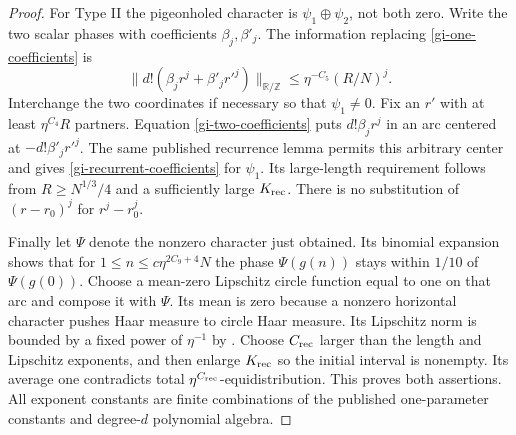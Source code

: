 \documentclass[11pt]{article}
\theoremstyle{definition}
\theoremstyle{remark}
\begin{document}
\begin{proof}
For Type II the pigeonholed character is $\psi_1\oplus\psi_2$, not both
zero.  Write the two scalar phases with coefficients $\beta_j,\beta'_j$.
The information replacing \eqref{gi-one-coefficients} is
\begin{equation}\label{gi-two-coefficients}
 \|d!(\beta_jr^j+\beta'_jr'^j)\|_{\mathbb R/\mathbb Z}
                        \leq\eta^{-C_5}(R/N)^j.
\end{equation}
Interchange the two coordinates if necessary so that $\psi_1\ne0$.
Fix an $r'$ with at least $\eta^{C_4}R$ partners.  Equation
\eqref{gi-two-coefficients} puts $d!\beta_jr^j$ in an arc centered at
$-d!\beta'_jr'^j$.  The same published recurrence lemma permits this
arbitrary center and gives \eqref{gi-recurrent-coefficients} for
$\psi_1$.  Its large-length requirement follows from
$R\geq N^{1/3}/4$ and a sufficiently large $K_{\rm rec}$.  There is no
substitution of $(r-r_0)^j$ for $r^j-r_0^j$.

Finally let $\Psi$ denote the nonzero character just obtained.  Its
binomial expansion shows that for
$1\leq n\leq c\eta^{2C_9+4}N$ the phase $\Psi(g(n))$ stays within
$1/10$ of $\Psi(g(0))$.  Choose a mean-zero Lipschitz circle function
equal to one on that arc and compose it with $\Psi$.  Its mean is zero
because a nonzero horizontal character pushes Haar measure to circle
Haar measure.  Its Lipschitz norm is bounded by a fixed power of
$\eta^{-1}$ by \cite[Appendix~A]{GTOrbits2012}.  Choose $C_{\rm rec}$
larger than the length and Lipschitz exponents, and then enlarge
$K_{\rm rec}$ so the initial interval is nonempty.  Its average one
contradicts total $\eta^{C_{\rm rec}}$-equidistribution.  This proves
both assertions.  All exponent constants are finite combinations of
the published one-parameter constants and degree-$d$ polynomial algebra.
\end{proof}
\end{document}
